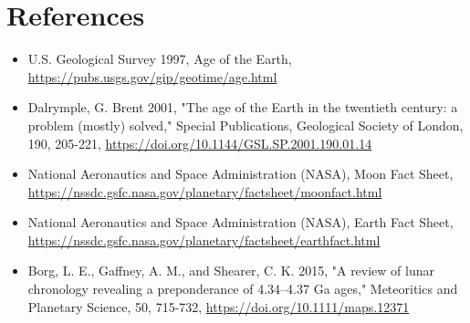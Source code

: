 \documentclass[12pt, letterpaper] {article}
\begin{document}
\section{References}

\begin{itemize}

    \item 
    U.S. Geological Survey 1997, Age of the Earth, \url{https://pubs.usgs.gov/gip/geotime/age.html}

    \item 
    Dalrymple, G. Brent 2001, "The age of the Earth in the twentieth century: a problem (mostly) solved," Special Publications, Geological Society of London, 190, 205-221, \url{https://doi.org/10.1144/GSL.SP.2001.190.01.14}

    \item 
    National Aeronautics and Space Administration (NASA), Moon Fact Sheet, \url{https://nssdc.gsfc.nasa.gov/planetary/factsheet/moonfact.html}

    \item 
    National Aeronautics and Space Administration (NASA), Earth Fact Sheet, \url{https://nssdc.gsfc.nasa.gov/planetary/factsheet/earthfact.html}

    \item 
    Borg, L. E., Gaffney, A. M., and Shearer, C. K. 2015, "A review of lunar chronology revealing a preponderance of 4.34–4.37 Ga ages," Meteoritics and Planetary Science, 50, 715-732, \url{https://doi.org/10.1111/maps.12371}
    
\end{itemize}
\end{document}
